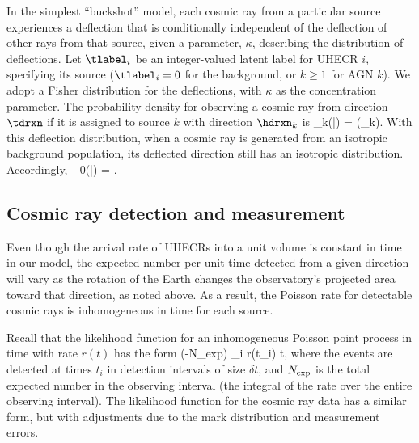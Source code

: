 In the simplest ``buckshot'' model, each cosmic ray from a particular source
experiences a deflection that is conditionally independent of the deflection
of other rays from that source, given a parameter, $\kappa$, describing the
distribution of deflections.  Let $\tlabel_i$ be an integer-valued latent
label for UHECR $i$, specifying its source ($\tlabel_i = 0$ for the background,
or $k \ge 1$ for AGN $k$).  We adopt a Fisher distribution for the
deflections, with $\kappa$ as the concentration parameter.  The probability
density for observing a cosmic ray from direction $\tdrxn$ if it is assigned
to source $k$ with direction $\hdrxn_k$ is
\be
\rho_k(\tdrxn|\kappa)
  = \frac{\kappa}{4\pi\sinh(\kappa)}\exp(\kappa\tdrxn\cdot\hdrxn_k).
\label{rho-def}
\ee
With this deflection distribution, when a cosmic ray is generated from an
isotropic background population, its deflected direction still has an
isotropic distribution.  Accordingly,
\be
\rho_0(\tdrxn|\kappa) =  .
\label{rho-iso}
\ee


\subsection{Cosmic ray detection and measurement}

Even though the arrival rate of UHECRs into a unit volume is constant in
time in our model, the expected number per unit time detected from a given
direction will vary as the rotation of the Earth changes the observatory's
projected area toward that direction, as noted above.  As a result, the
Poisson rate for detectable cosmic rays is inhomogeneous in time for
each source.

Recall that the likelihood function for an inhomogeneous Poisson
point process in time with rate $r(t)$ has the form
\be
\exp(-N_{\rm exp}) \prod_i r(t_i) \delta t,
\label{simple-ppp-like}
\ee
where the events are detected at times $t_i$ in detection intervals of size
$\delta t$, and $N_{\rm exp}$ is the total expected number in the observing
interval (the integral of the rate over the entire observing interval).  The
likelihood function for the cosmic ray data has a similar form, but with
adjustments due to the mark distribution and measurement errors.

